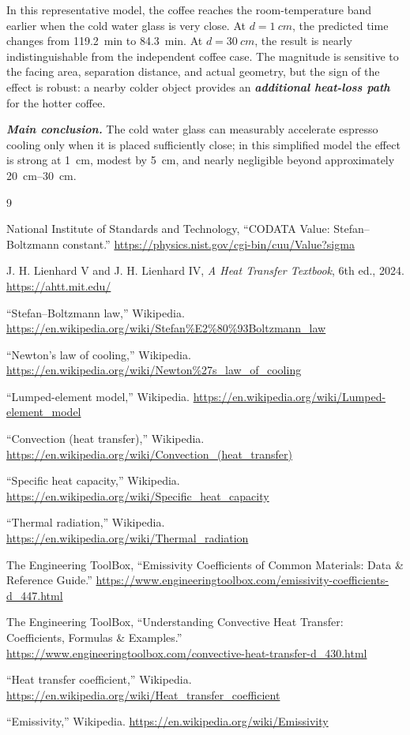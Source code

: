 \documentclass[11pt]{article}
\begin{document}
In this representative model, the coffee reaches the room-temperature band earlier when the cold water glass is very close. At $d=\SI{1}{cm}$, the predicted time changes from \SI{119.2}{min} to \SI{84.3}{min}. At $d=\SI{30}{cm}$, the result is nearly indistinguishable from the independent coffee case. The magnitude is sensitive to the facing area, separation distance, and actual geometry, but the sign of the effect is robust: a nearby colder object provides an \textbf{\textit{additional heat-loss path}} for the hotter coffee.

\noindent\textbf{\textit{Main conclusion.}} The cold water glass can measurably accelerate espresso cooling only when it is placed sufficiently close; in this simplified model the effect is strong at \SI{1}{cm}, modest by \SI{5}{cm}, and nearly negligible beyond approximately \SIrange{20}{30}{cm}.

\begin{thebibliography}{9}

National Institute of Standards and Technology,
``CODATA Value: Stefan--Boltzmann constant.''
\url{https://physics.nist.gov/cgi-bin/cuu/Value?sigma}

J. H. Lienhard V and J. H. Lienhard IV,
\textit{A Heat Transfer Textbook}, 6th ed., 2024.
\url{https://ahtt.mit.edu/}

``Stefan--Boltzmann law,'' Wikipedia.
\url{https://en.wikipedia.org/wiki/Stefan%E2%80%93Boltzmann_law}

``Newton's law of cooling,'' Wikipedia.
\url{https://en.wikipedia.org/wiki/Newton%27s_law_of_cooling}

``Lumped-element model,'' Wikipedia.
\url{https://en.wikipedia.org/wiki/Lumped-element_model}

``Convection (heat transfer),'' Wikipedia.
\url{https://en.wikipedia.org/wiki/Convection_(heat_transfer)}

``Specific heat capacity,'' Wikipedia.
\url{https://en.wikipedia.org/wiki/Specific_heat_capacity}

``Thermal radiation,'' Wikipedia.
\url{https://en.wikipedia.org/wiki/Thermal_radiation}

The Engineering ToolBox,
``Emissivity Coefficients of Common Materials: Data \& Reference Guide.''
\url{https://www.engineeringtoolbox.com/emissivity-coefficients-d_447.html}

The Engineering ToolBox,
``Understanding Convective Heat Transfer: Coefficients, Formulas \& Examples.''
\url{https://www.engineeringtoolbox.com/convective-heat-transfer-d_430.html}

``Heat transfer coefficient,'' Wikipedia.
\url{https://en.wikipedia.org/wiki/Heat_transfer_coefficient}

``Emissivity,'' Wikipedia.
\url{https://en.wikipedia.org/wiki/Emissivity}

\end{thebibliography}
\end{document}
